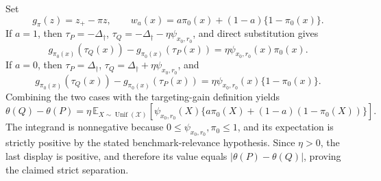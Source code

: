Set
\[
g_{\pi}(z)=z_+-\pi z,
\qquad
w_a(x)=a\pi_0(x)+(1-a)\{1-\pi_0(x)\}.
\]
If \(a=1\), then
\(\tau_P=-\Delta_\dagger\),
\(\tau_Q=-\Delta_\dagger-\eta\psi_{x_0,r_0}\), and direct substitution gives
\[
g_{\pi_0(x)}(\tau_Q(x))-g_{\pi_0(x)}(\tau_P(x))
=\eta\psi_{x_0,r_0}(x)\pi_0(x).
\]
If \(a=0\), then
\(\tau_P=\Delta_\dagger\),
\(\tau_Q=\Delta_\dagger+\eta\psi_{x_0,r_0}\), and
\[
g_{\pi_0(x)}(\tau_Q(x))-g_{\pi_0(x)}(\tau_P(x))
=\eta\psi_{x_0,r_0}(x)\{1-\pi_0(x)\}.
\]
Combining the two cases with the targeting-gain definition yields
\[
\theta(Q)-\theta(P)
=\eta\,\mathbb E_{X\sim\operatorname{Unif}(\mathcal X)}
 \left[\psi_{x_0,r_0}(X)
 \{a\pi_0(X)+(1-a)(1-\pi_0(X))\}\right].
\]
The integrand is nonnegative because \(0\le\psi_{x_0,r_0},\pi_0\le1\), and its expectation is strictly positive by the stated benchmark-relevance hypothesis.  Since \(\eta>0\), the last display is positive, and therefore its value equals \(|\theta(P)-\theta(Q)|\), proving the claimed strict separation.

